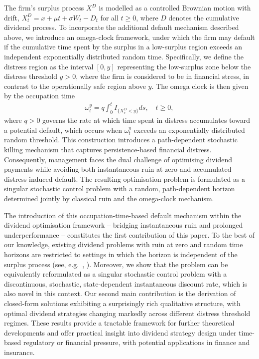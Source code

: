\documentclass[11pt]{article} %
\numberwithin{komcounter}{section}
\numberwithin{equation}{section}
\numberwithin{theorem}{section}
\begin{document}
The firm’s surplus process $X^D$ is modelled as a controlled Brownian motion with drift,
$X^D_t = x + \mu t + \sigma W_t - D_t$ for all $t \geq 0$, where $D$ denotes the cumulative dividend process. 
To incorporate the additional default mechanism described above, we introduce an omega-clock framework, under which the firm may default if the cumulative time spent by the surplus in a low-surplus region exceeds an independent exponentially distributed random time. 
Specifically, we define the distress region as the interval $[0,y]$ representing the low-surplus zone below the distress threshold $y>0$, where the firm is considered to be in financial stress, in contrast to the operationally safe region above $y$. 
The omega clock is then given by the occupation time
\begin{align} \label{omega_clock}
\omega_t^y = q \int_0^t I_{\{X_s^D<y\}}ds, \quad t \geq 0,
\end{align}
where $q>0$ governs the rate at which time spent in distress accumulates toward a potential default, which occurs when $\omega_t^y$ exceeds an exponentially distributed random threshold. 
This construction introduces a path-dependent stochastic killing mechanism that captures persistence-based financial distress. 
Consequently, management faces the dual challenge of optimising dividend payments while avoiding both instantaneous ruin at zero and accumulated distress-induced default. 
The resulting optimisation problem is formulated as a singular stochastic control problem with a random, path-dependent horizon determined jointly by classical ruin and the omega-clock mechanism.

The introduction of this occupation-time-based default mechanism within the dividend optimisation framework -- bridging instantaneous ruin and prolonged underperformance -- constitutes the first contribution of this paper. 
To the best of our knowledge, existing dividend problems with ruin at zero and random time horizons are restricted to settings in which the horizon is independent of the surplus process (see, e.g.~\cite{doi:10.1142/9789814383318_0007}, \cite{zhao2015optimal}). 
Moreover, we show that the problem can be equivalently reformulated as a singular stochastic control problem with a discontinuous, stochastic, state-dependent instantaneous discount rate, which is also novel in this context. 
Our second main contribution is the derivation of closed-form solutions exhibiting a surprisingly rich qualitative structure, with optimal dividend strategies changing markedly across different distress threshold regimes. 
These results provide a tractable framework for further theoretical developments and offer practical insight into dividend strategy design under time-based regulatory or financial pressure, with potential applications in finance and insurance.
\end{document}
